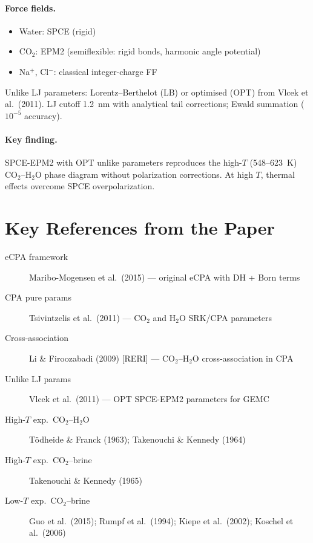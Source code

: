 \documentclass[11pt]{article}
\begin{document}
\paragraph{Force fields.}
\begin{itemize}
  \item Water: SPCE (rigid)
  \item CO$_2$: EPM2 (semiflexible: rigid bonds, harmonic angle potential)
  \item Na$^+$, Cl$^-$: classical integer-charge FF
\end{itemize}
Unlike LJ parameters: Lorentz--Berthelot (LB) or optimised (OPT) from Vlcek et al.\ (2011).
LJ cutoff 1.2~nm with analytical tail corrections; Ewald summation ($10^{-5}$ accuracy).

\paragraph{Key finding.} SPCE-EPM2 with OPT unlike parameters reproduces the high-$T$
(548--623~K) CO$_2$--H$_2$O phase diagram without polarization corrections.
At high $T$, thermal effects overcome SPCE overpolarization.

\section{Key References from the Paper}

\begin{description}
  \item[eCPA framework] Maribo-Mogensen et al.\ (2015) --- original eCPA with DH + Born terms
  \item[CPA pure params] Tsivintzelis et al.\ (2011) --- CO$_2$ and H$_2$O SRK/CPA parameters
  \item[Cross-association] Li \& Firoozabadi (2009) [RERI] --- CO$_2$--H$_2$O cross-association in CPA
  \item[Unlike LJ params] Vlcek et al.\ (2011) --- OPT SPCE-EPM2 parameters for GEMC
  \item[High-$T$ exp.\ CO$_2$--H$_2$O] Tödheide \& Franck (1963); Takenouchi \& Kennedy (1964)
  \item[High-$T$ exp.\ CO$_2$--brine] Takenouchi \& Kennedy (1965)
  \item[Low-$T$ exp.\ CO$_2$--brine] Guo et al.\ (2015); Rumpf et al.\ (1994); Kiepe et al.\ (2002); Koschel et al.\ (2006)
\end{description}
\end{document}
